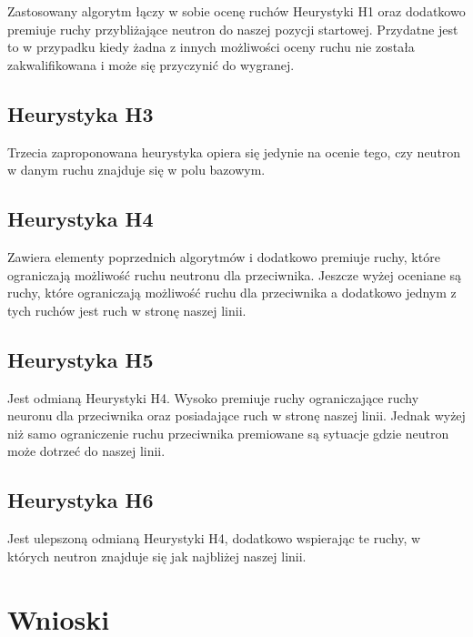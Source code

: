 \documentclass[a4paper,12pt]{article}
\begin{document}
Zastosowany algorytm łączy w sobie ocenę ruchów Heurystyki H1 oraz dodatkowo premiuje ruchy przybliżające neutron do naszej pozycji startowej. Przydatne jest to w przypadku kiedy żadna z innych możliwości oceny ruchu nie została zakwalifikowana i może się przyczynić do wygranej.

\subsection{Heurystyka H3}

Trzecia zaproponowana heurystyka opiera się jedynie na ocenie tego, czy neutron w danym ruchu znajduje się w polu bazowym.

\subsection{Heurystyka H4}

Zawiera elementy poprzednich algorytmów i dodatkowo premiuje ruchy, które ograniczają możliwość ruchu neutronu dla przeciwnika. Jeszcze wyżej oceniane są ruchy, które ograniczają możliwość ruchu dla przeciwnika a dodatkowo jednym z tych ruchów jest ruch w stronę naszej linii.

\subsection{Heurystyka H5}
Jest odmianą Heurystyki H4. Wysoko premiuje ruchy ograniczające ruchy neuronu dla przeciwnika oraz posiadające ruch w stronę naszej linii. Jednak wyżej niż samo ograniczenie ruchu przeciwnika premiowane są sytuacje gdzie neutron może dotrzeć do naszej linii.

\subsection{Heurystyka H6}

Jest ulepszoną odmianą Heurystyki H4, dodatkowo wspierając te ruchy, w których neutron znajduje się jak najbliżej naszej linii.

\section{Wnioski}
\end{document}
